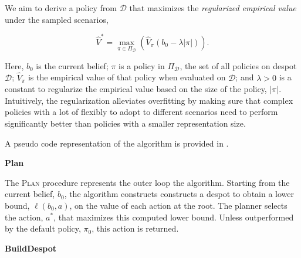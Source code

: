 We aim to derive a policy from $\mathcal{D}$ that maximizes the \emph{regularized empirical value}
under the sampled scenarios,

\begin{equation}
  \hat{V}^\ast = \max_{\pi\in\Pi_\mathcal{D}}\left(\hat{V}_\pi(b_0 - \lambda|\pi|)\right).
\end{equation}

Here, $b_0$ is the current belief; $\pi$ is a policy in $\Pi_\mathcal{D}$, the
set of all policies on \ac{despot} $\mathcal{D}$; $\hat{V}_\pi$ is the
empirical value of that policy when evaluated on $\mathcal{D}$; and $\lambda
> 0$ is a constant to regularize the empirical value based on the size of the
policy, $|\pi|$. Intuitively, the regularization alleviates overfitting by
making sure that complex policies with a lot of flexibly to adopt to different
scenarios need to perform significantly better than policies with a smaller
representation size.


A pseudo code representation of the algorithm is provided in .


\textbf{Plan}

The \textsc{Plan} procedure represents the outer loop the algorithm. Starting
from the current belief, $b_0$, the algorithm constructs constructs
a \ac{despot} to obtain a lower bound, $\ell(b_0, a)$, on the value of each
action at the root. The planner selects the action, $a^\ast$, that maximizes
this computed lower bound. Unless outperformed by the default policy, $\pi_0$,
this action is returned.

\textbf{BuildDespot}




